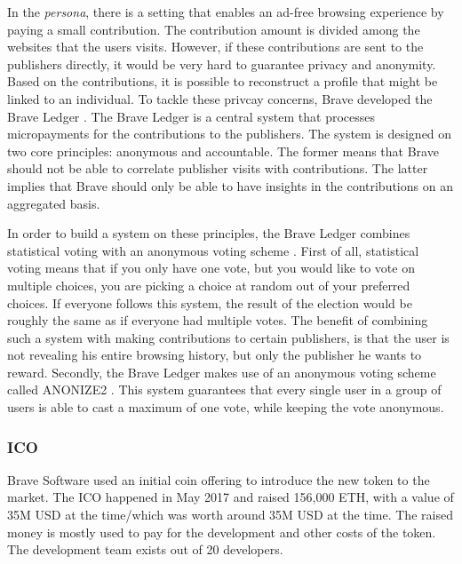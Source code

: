 In the \textit{persona}, there is a setting that enables an ad-free browsing experience by paying a small contribution. The contribution amount is divided among the websites that the users visits. However, if these contributions are sent to the publishers directly, it would be very hard to guarantee privacy and anonymity. Based on the contributions, it is possible to reconstruct a profile that might be linked to an individual. To tackle these privcay concerns, Brave developed the Brave Ledger \cite{bat-ledger}. The Brave Ledger is a central system that processes micropayments for the contributions to the publishers. The system is designed on two core principles: anonymous and accountable. The former means that Brave should not be able to correlate publisher visits with contributions. The latter implies that Brave should only be able to have insights in the contributions on an aggregated basis.

In order to build a system on these principles, the Brave Ledger combines statistical voting with an anonymous voting scheme \cite{bat-ledger}. First of all, statistical voting means that if you only have one vote, but you would like to vote on multiple choices, you are picking a choice at random out of your preferred choices. If everyone follows this system, the result of the election would be roughly the same as if everyone had multiple votes. The benefit of combining such a system with making contributions to certain publishers, is that the user is not revealing his entire browsing history, but only the publisher he wants to reward. Secondly, the Brave Ledger makes use of an anonymous voting scheme called ANONIZE2 \cite{hohenberger2014anonize}. This system guarantees that every single user in a group of users is able to cast a maximum of one vote, while keeping the vote anonymous.







\subsubsection{ICO}
Brave Software used an initial coin offering to introduce the new token to the market. The ICO happened in May 2017 and raised 156,000 ETH, with a value of 35M USD at the time/which was worth around 35M USD at the time. The raised money is mostly used to pay for the development and other costs of the token. The development team exists out of 20 developers.



